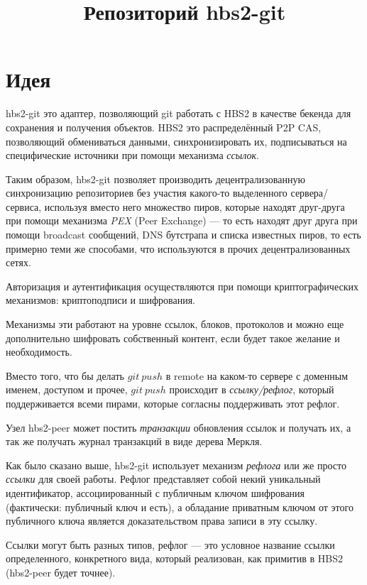 \documentclass[11pt,a4paper]{article}
\title{Репозиторий hbs2-git}
\newcommand{\term}[2]{\textit{#2}}
\begin{document}
\maketitle

\section{Идея}

hbs2-git это адаптер, позволяющий git работать с HBS2 в качестве бекенда для сохранения и получения
объектов. HBS2 это распределённый P2P CAS, позволяющий обмениваться данными, синхронизировать их,
подписываться на специфические источники при помощи механизма \term{reflog}{ссылок}.

Таким образом, hbs2-git позволяет производить децентрализованную синхронизацию репозиториев без
участия какого-то выделенного сервера/сервиса, используя вместо него множество пиров, которые
находят друг-друга при помощи механизма \term{pex}{PEX} (Peer Exchange) --- то есть находят друг
друга при помощи broadcast сообщений, DNS бутстрапа и списка известных пиров, то есть примерно  теми
же способами, что используются в прочих децентрализованных сетях.

Авторизация и аутентификация осуществляются при помощи криптографических механизмов: криптоподписи
и шифрования.

Механизмы эти работают на уровне ссылок, блоков, протоколов и можно еще дополнительно шифровать
собственный контент, если будет такое желание и необходимость.

Вместо того, что бы делать $git~push$ в remote на каком-то сервере с доменным именем, доступом и
прочее, $git~push$ происходит в \term{reflog}{ссылку/рефлог}, который поддерживается всеми пирами,
которые согласны поддерживать этот рефлог.

Узел hbs2-peer может постить \term{transaction}{транзакции} обновления ссылок и получать их, а так же
получать журнал транзакций в виде дерева Меркля.

Как было сказано выше, hbs2-git использует механизм \term{reflog}{рефлога} или же просто
\term{reflog}{ссылки} для своей работы. Рефлог представляет собой некий уникальный идентификатор,
ассоциированный с публичным ключом шифрования (фактически: публичный ключ и есть), а обладание
приватным ключом от этого публичного ключа является доказательством права записи в эту ссылку.

Ссылки могут быть разных типов, рефлог --- это условное название ссылки определенного, конкретного
вида, который реализован, как примитив в HBS2 (hbs2-peer будет точнее).
\end{document}
